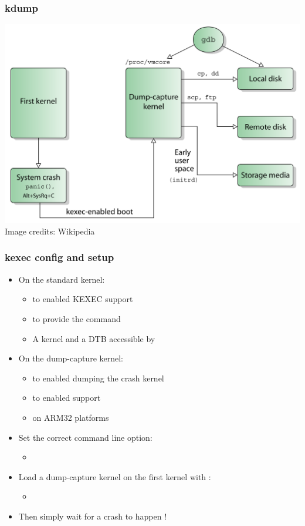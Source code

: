 \begin{frame}
  \frametitle{kdump}
  \center\includegraphics[height=0.8\textheight]{slides/debugging-kernel-debugging/kdump.png}\\
  \tiny Image credits: Wikipedia
\end{frame}

\begin{frame}[fragile]
  \frametitle{kexec config and setup}
  \begin{itemize}
    \item On the standard kernel:
    \begin{itemize}
      \item {} to enabled KEXEC support
      \item {} to provide the  command
      \item A kernel and a DTB accessible by 
    \end{itemize}
    \item On the dump-capture kernel:
    \begin{itemize}
      \item {} to enabled dumping the crash
            kernel
      \item {} to enabled 
        support
      \item {} on ARM32 platforms
    \end{itemize}
    \item Set the correct  command line option:
    \begin{itemize}
      \item {}
    \end{itemize}
    \item Load a dump-capture kernel on the first kernel with :
    \begin{itemize}
      \item {}
    \end{itemize}
    \item Then simply wait for a crash to happen !
  \end{itemize}
\end{frame}

